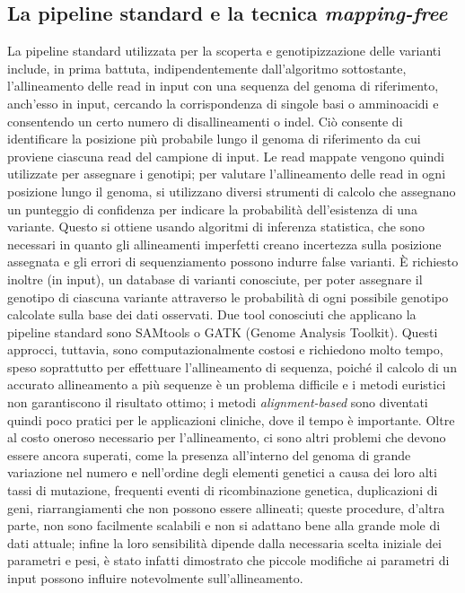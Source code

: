 \documentclass[../main.tex]{subfiles}
\begin{document}
\subsection{La pipeline standard e la tecnica \textit{mapping-free}}

La pipeline standard utilizzata per la scoperta e genotipizzazione delle varianti include, in prima battuta, indipendentemente dall'algoritmo sottostante, l'allineamento delle read in input con una sequenza del genoma di riferimento, anch'esso in input, cercando la corrispondenza di singole basi o amminoacidi e consentendo un certo numero di disallineamenti o indel. Ciò consente di identificare la posizione più probabile lungo il genoma di riferimento da cui proviene ciascuna read del campione di input. Le read mappate vengono quindi utilizzate per assegnare i genotipi; per valutare l'allineamento delle read in ogni posizione lungo il genoma, si utilizzano diversi strumenti di calcolo che assegnano un punteggio di confidenza per indicare la probabilità dell'esistenza di una variante. Questo si ottiene usando algoritmi di inferenza statistica, che sono necessari in quanto gli allineamenti imperfetti creano incertezza sulla posizione assegnata e gli errori di sequenziamento possono indurre false varianti. È richiesto inoltre (in input), un database di varianti conosciute, per poter assegnare il genotipo di ciascuna variante attraverso le probabilità di ogni possibile genotipo calcolate sulla base dei dati osservati. Due tool conosciuti che applicano la pipeline standard sono  SAMtools o GATK (Genome Analysis Toolkit)\cite{McKenna2010gatk}. Questi approcci, tuttavia, sono computazionalmente costosi e richiedono molto tempo, speso soprattutto per effettuare l'allineamento di sequenza, poiché il calcolo di un accurato allineamento a più sequenze è un problema difficile e i metodi euristici non garantiscono il risultato ottimo; i metodi \textit{alignment-based} sono diventati quindi poco pratici per le applicazioni cliniche, dove il tempo è importante. Oltre al costo oneroso necessario per l'allineamento, ci sono altri problemi che devono essere ancora superati, come la presenza all'interno del genoma di grande variazione nel numero e nell'ordine degli elementi genetici a causa dei loro alti tassi di mutazione, frequenti eventi di ricombinazione genetica, duplicazioni di geni, riarrangiamenti che non possono essere allineati; queste procedure, d'altra parte, non sono facilmente scalabili e non si adattano bene alla grande mole di dati attuale; infine la loro sensibilità dipende dalla necessaria scelta iniziale dei parametri e pesi, è stato infatti dimostrato che piccole modifiche ai parametri di input possono influire notevolmente sull'allineamento. \\
\end{document}
